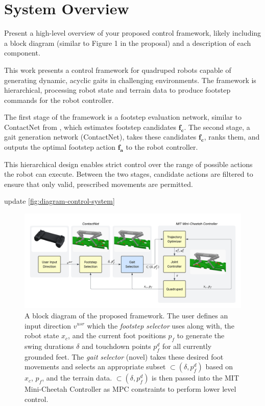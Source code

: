 \section{System Overview}

\begin{outline}
  Present a high-level overview of your proposed control framework,
  likely including a block diagram (similar to Figure 1 in the
  proposal) and a description of each component.
\end{outline}

This work presents a control framework for quadruped robots capable
of generating dynamic, acyclic gaits in challenging environments. The
framework is hierarchical, processing robot state and terrain data to
produce footstep commands for the robot controller.

The first stage of the framework is a footstep evaluation network,
similar to ContactNet from \cite{bratta_contactnet_2024}, which
estimates footstep candidates $\mathbf{f_c}$. The second stage, a
gait generation network (ContactNet), takes these candidates
$\mathbf{f_c}$, ranks them, and outputs the optimal footstep action
$\mathbf{f_a}$ to the robot controller.

This hierarchical design enables strict control over the range of
possible actions the robot can execute. Between the two stages,
candidate actions are filtered to ensure that only valid, prescribed
movements are permitted.

\begin{todo}
  update \autoref{fig:diagram-control-system}
\end{todo}

\begin{figure}[H]
  \centering
  \includegraphics[width=1.0\linewidth]{images/diagrams/control-system.png}
  \caption{A block diagram of the proposed framework. The user
    defines an input direction $v^{usr}$ which the \textit{footstep
    selector} \cite{bratta_contactnet_2024} uses along with, the robot
    state $x_c$, and the current foot positions $p_f$ to generate the
    swing durations $\delta$ and touchdown points $p_f^d$ for all
    currently grounded feet. The \textit{gait selector} (novel) takes
    these desired foot movements and selects an appropriate subset
    $\subset(\delta,p_f^d)$ based on $x_c$, $p_f$, and the terrain
    data. $\subset(\delta,p_f^d)$ is then passed into the MIT
  Mini-Cheetah Controller as MPC constraints to perform lower level control.}
  \label{fig:diagram-control-system}
\end{figure}
